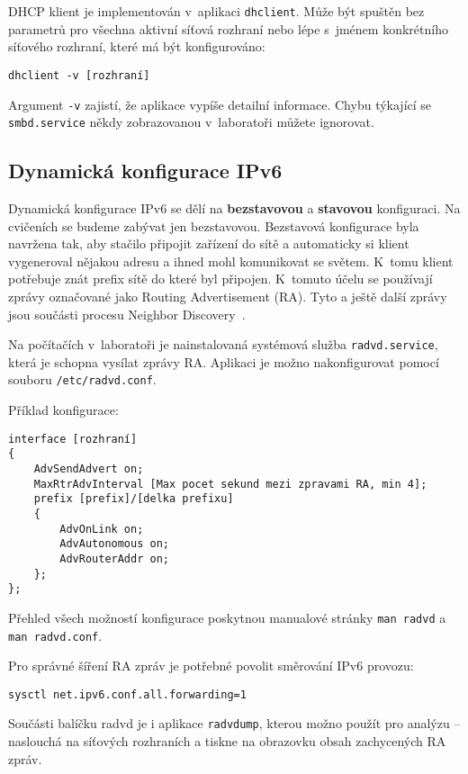 DHCP klient je implementován v~aplikaci \texttt{dhclient}. Může být spuštěn bez
parametrů pro všechna aktivní síťová rozhraní nebo lépe s~jménem konkrétního
síťového rozhraní, které má být konfigurováno:
\begin{verbatim}
dhclient -v [rozhraní]
\end{verbatim}
Argument \texttt{-v} zajistí, že aplikace vypíše detailní informace.
Chybu týkající se {\tt smbd.service} někdy zobrazovanou v~laboratoři můžete ignorovat.

\subsection{Dynamická konfigurace IPv6}
\label{dynipv6}

Dynamická konfigurace IPv6 se dělí na {\bf bezstavovou} a {\bf stavovou}
konfiguraci. Na cvičeních se budeme zabývat jen bezstavovou. Bezstavová
konfigurace byla navržena tak, aby stačilo připojit zařízení do sítě a
automaticky si klient vygeneroval nějakou adresu a ihned mohl komunikovat se
světem. K~tomu klient potřebuje znát prefix sítě do které byl připojen.
K~tomuto účelu se používají zprávy označované jako Routing Advertisement (RA).
Tyto a ještě další zprávy jsou součásti procesu Neighbor Discovery~\cite{rfc4861}.

Na počítačích v~laboratoři je nainstalovaná systémová služba {\tt radvd.service},
která je schopna vysílat zprávy RA. Aplikaci je možno nakonfigurovat pomocí
souboru {\tt /etc/radvd.conf}.

Příklad konfigurace:
\begin{verbatim}
interface [rozhraní]
{
    AdvSendAdvert on;
    MaxRtrAdvInterval [Max pocet sekund mezi zpravami RA, min 4];
    prefix [prefix]/[delka prefixu]
    {
        AdvOnLink on;
        AdvAutonomous on;
        AdvRouterAddr on;
    };
};
\end{verbatim}
Přehled všech možností konfigurace poskytnou manualové stránky {\tt man radvd}
a {\tt man radvd.conf}.

Pro správné šíření RA zpráv je potřebné povolit směrování IPv6 provozu:
\begin{verbatim}
sysctl net.ipv6.conf.all.forwarding=1
\end{verbatim}

Součásti balíčku radvd je i aplikace {\tt radvdump}, kterou možno použít pro
analýzu -- naslouchá na síťových rozhraních a tiskne na obrazovku obsah
zachycených RA zpráv.
